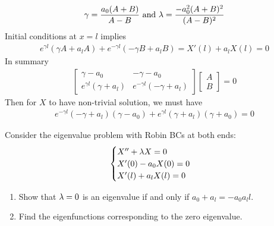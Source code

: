 \documentclass{report}
\begin{document}
\begin{mdframed}
\begin{align*}
\gamma = \frac{a_0(A+B)}{A-B}\text{ and }\lambda = \frac{-a_0^2(A+B)^2}{(A-B)^2}
\end{align*}
Initial conditions at $x=l$ implies 
\begin{align*}
e^{\gamma l}(\gamma A+a_lA)+e^{- \gamma l}(-\gamma B+a_lB)= X'(l)+a_lX(l)=0 
\end{align*}
In summary 
 \begin{align*}
\begin{bmatrix}
  \gamma -a_0 & -\gamma -a_0 \\
  e^{\gamma l}(\gamma +a_l) & e^{-\gamma l}(-\gamma +a_l)
\end{bmatrix} \begin{bmatrix}
A\\
B
\end{bmatrix}=0
\end{align*}
Then for $X$ to have non-trivial solution, we must have 
\begin{align*}
e^{-\gamma l}(-\gamma +a_l)(\gamma -a_0)+e^{\gamma l}(\gamma +a_l)(\gamma +a_0)=0
\end{align*}
\end{mdframed}
\begin{question}{}{}
Consider the eigenvalue problem with Robin BCs at both ends: 
\begin{align*}
\begin{cases}  
X''+\lambda X=0\\
X'(0)-a_0X(0)=0\\
X'(l)+a_lX(l)=0
\end{cases}
\end{align*}
\begin{enumerate}[label=(\alph*)]
  \item Show that $\lambda =0$ is an eigenvalue if and only if $a_0+a_l=-a_0a_ll$. 
  \item Find the eigenfunctions corresponding to the zero eigenvalue. 
\end{enumerate}
\end{question}
\end{document}
